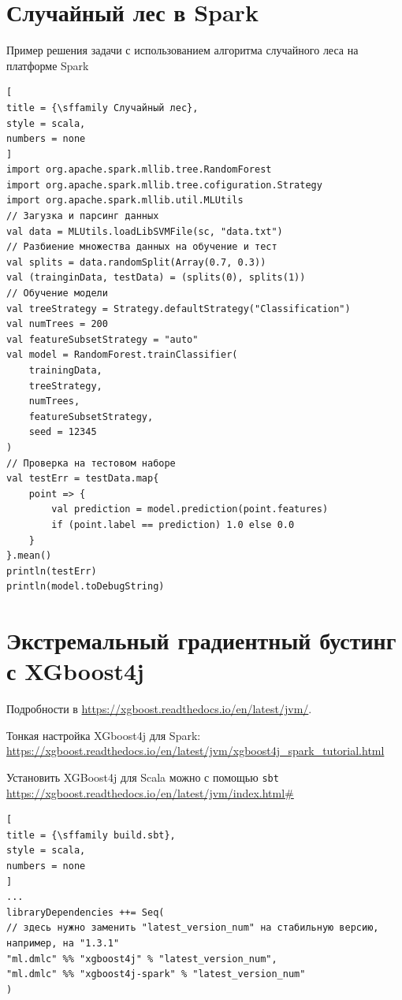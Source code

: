 \documentclass[%
	11pt,
	a4paper,
	utf8,
		]{article}
\begin{document}
\section{Случайный лес в Spark}

Пример решения задачи с использованием алгоритма случайного леса на платформе Spark
\begin{lstlisting}[
title = {\sffamily Случайный лес},
style = scala,
numbers = none	
]
import org.apache.spark.mllib.tree.RandomForest
import org.apache.spark.mllib.tree.cofiguration.Strategy
import org.apache.spark.mllib.util.MLUtils
// Загузка и парсинг данных
val data = MLUtils.loadLibSVMFile(sc, "data.txt")
// Разбиение множества данных на обучение и тест
val splits = data.randomSplit(Array(0.7, 0.3))
val (trainginData, testData) = (splits(0), splits(1))
// Обучение модели
val treeStrategy = Strategy.defaultStrategy("Classification")
val numTrees = 200
val featureSubsetStrategy = "auto"
val model = RandomForest.trainClassifier(
    trainingData,
    treeStrategy,
    numTrees,
    featureSubsetStrategy,
    seed = 12345
)
// Проверка на тестовом наборе
val testErr = testData.map{
    point => {
    	val prediction = model.prediction(point.features)
    	if (point.label == prediction) 1.0 else 0.0
    }
}.mean()
println(testErr)
println(model.toDebugString)
\end{lstlisting}

\section{Экстремальный градиентный бустинг с XGboost4j}

Подробности в \url{https://xgboost.readthedocs.io/en/latest/jvm/}.

Тонкая настройка XGboost4j для Spark: \url{https://xgboost.readthedocs.io/en/latest/jvm/xgboost4j_spark_tutorial.html}

Установить XGBoost4j для Scala можно с помощью \texttt{sbt} \url{https://xgboost.readthedocs.io/en/latest/jvm/index.html#}
\begin{lstlisting}[
title = {\sffamily build.sbt},
style = scala,
numbers = none	
]
...
libraryDependencies ++= Seq(
// здесь нужно заменить "latest_version_num" на стабильную версию, например, на "1.3.1"
"ml.dmlc" %% "xgboost4j" % "latest_version_num", 
"ml.dmlc" %% "xgboost4j-spark" % "latest_version_num"
)
\end{lstlisting}
\end{document}
